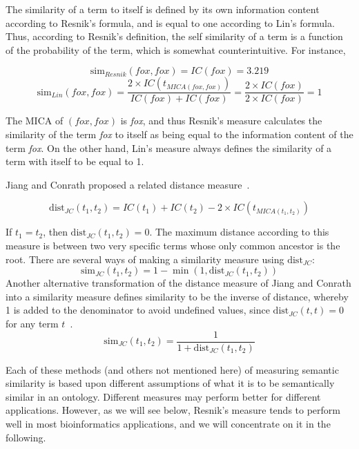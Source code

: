 \documentclass{article}
\begin{document}
 
The similarity of a term to itself is defined by its own information 
content according to  Resnik's formula, and is equal to one according 
to Lin's formula. Thus, according to Resnik's definition, the self 
similarity of a term is a function of the probability of the term, 
which is somewhat counterintuitive. For instance, 
 
 
\begin{equation*} 
\mathrm{sim}_{Resnik}(fox,fox) = IC(fox) = 3.219 
\end{equation*} 
\begin{equation*} 
\mathrm{sim}_{Lin}(fox,fox) = 
\dfrac{2\times IC(t_{MICA(fox,fox)})}{IC(fox) + IC(fox)} = \dfrac{2\times 
  IC(fox)}{2\times IC(fox)}= 1 
\end{equation*} 
 
The MICA of $(fox, fox)$ is \textit{fox}, and thus Resnik's measure 
calculates the similarity of the term \textit{fox} to itself as being 
equal to the information content of the term \textit{fox}. On the 
other hand, Lin's measure always defines the similarity of a term with 
itself to be equal to 1. 
 
Jiang and Conrath 
proposed a related distance measure~\cite{Jiang1997}. 
 
\begin{equation} 
\mathrm{dist}_{JC}(t_1,t_2) = IC(t_1) + IC(t_2) - 2\times IC(t_{MICA(t_1,t_2)}) 
\label{eq:distance-JC} 
\end{equation} 
 
If $t_1 = t_2$, then $\mathrm{dist}_{JC}(t_1,t_2) = 0$. The maximum 
distance according to this measure is between two very specific terms 
whose only common ancestor is the root. There are several ways of making a similarity measure using 
$\mathrm{dist}_{JC}$: 
\begin{equation} 
\mathrm{sim}_{JC}(t_1,t_2) = 1 - \min(1,\mathrm{dist}_{JC}(t_1,t_2)) 
\label{eq:semsim-JC} 
\end{equation} 
Another alternative transformation of the distance measure of Jiang and 
Conrath into a similarity measure defines similarity to be the inverse 
of distance, whereby 1 is added to the denominator to avoid undefined 
values, since $\mathrm{dist}_{JC}(t,t)=0$ for any term $t$~\cite{Couto2007}. 
\begin{equation} 
\mathrm{sim}_{JC}(t_1,t_2) = \dfrac{1}{1+\mathrm{dist}_{JC}(t_1,t_2)} 
\label{eq:semsim-JC2} 
\end{equation} 
 
Each of these methods (and others not mentioned here) of measuring 
semantic similarity is based upon different assumptions of what it is 
to be semantically similar in an ontology. Different measures may 
perform better for different applications.  However, as we will see below, 
Resnik's measure tends to perform well in most bioinformatics 
applications, and we will concentrate on it in the following. 
 
\end{document}
